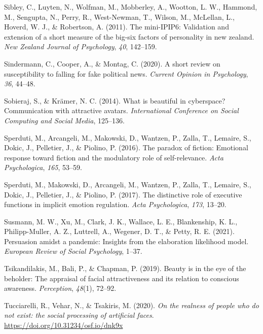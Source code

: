 \documentclass[
  man,floatsintext]{apa6}
\newlength{\cslhangindent}
\newlength{\cslentryspacingunit} %
\newenvironment{CSLReferences}[2] %
 {%
  \setlength{\parindent}{0pt}
  \ifodd #1
  \let\oldpar\par
  \def\par{\hangindent=\cslhangindent\oldpar}
  \fi
  \setlength{\parskip}{#2\cslentryspacingunit}
 }%
 {}
\begin{document}
\begin{CSLReferences}{1}{0}
\leavevmode{}%
Sibley, C., Luyten, N., Wolfman, M., Mobberley, A., Wootton, L. W., Hammond, M., Sengupta, N., Perry, R., West-Newman, T., Wilson, M., McLellan, L., Hoverd, W. J., \& Robertson, A. (2011). The mini-IPIP6: Validation and extension of a short measure of the big-six factors of personality in new zealand. \emph{New Zealand Journal of Psychology}, \emph{40}, 142--159.

\leavevmode{}%
Sindermann, C., Cooper, A., \& Montag, C. (2020). A short review on susceptibility to falling for fake political news. \emph{Current Opinion in Psychology}, \emph{36}, 44--48.

\leavevmode{}%
Sobieraj, S., \& Krämer, N. C. (2014). What is beautiful in cyberspace? Communication with attractive avatars. \emph{International Conference on Social Computing and Social Media}, 125--136.

\leavevmode{}%
Sperduti, M., Arcangeli, M., Makowski, D., Wantzen, P., Zalla, T., Lemaire, S., Dokic, J., Pelletier, J., \& Piolino, P. (2016). The paradox of fiction: Emotional response toward fiction and the modulatory role of self-relevance. \emph{Acta Psychologica}, \emph{165}, 53--59.

\leavevmode{}%
Sperduti, M., Makowski, D., Arcangeli, M., Wantzen, P., Zalla, T., Lemaire, S., Dokic, J., Pelletier, J., \& Piolino, P. (2017). The distinctive role of executive functions in implicit emotion regulation. \emph{Acta Psychologica}, \emph{173}, 13--20.

\leavevmode{}%
Susmann, M. W., Xu, M., Clark, J. K., Wallace, L. E., Blankenship, K. L., Philipp-Muller, A. Z., Luttrell, A., Wegener, D. T., \& Petty, R. E. (2021). Persuasion amidst a pandemic: Insights from the elaboration likelihood model. \emph{European Review of Social Psychology}, 1--37.

\leavevmode{}%
Tsikandilakis, M., Bali, P., \& Chapman, P. (2019). Beauty is in the eye of the beholder: The appraisal of facial attractiveness and its relation to conscious awareness. \emph{Perception}, \emph{48}(1), 72--92.

\leavevmode{}%
Tucciarelli, R., Vehar, N., \& Tsakiris, M. (2020). \emph{On the realness of people who do not exist: the social processing of artificial faces}. \url{https://doi.org/10.31234/osf.io/dnk9x}


\end{CSLReferences}
\end{document}
